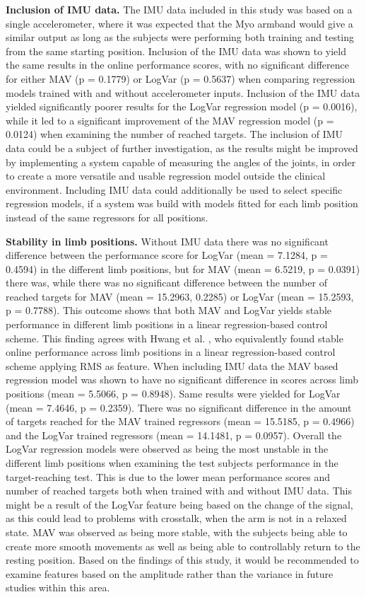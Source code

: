 \begin{multicols}{2}
\textbf{Inclusion of IMU data.} The IMU data included in this study was based on a single accelerometer, where it was expected that the Myo armband would give a similar output as long as the subjects were performing both training and testing from the same starting position. Inclusion of the IMU data was shown to yield the same results in the online performance scores, with no significant difference for either MAV (p = 0.1779) or LogVar (p = 0.5637) when comparing regression models trained with and without accelerometer inputs. Inclusion of the IMU data yielded significantly poorer results for the LogVar regression model (p = 0.0016), while it led to a significant improvement of the MAV regression model (p = 0.0124) when examining the number of reached targets. The inclusion of IMU data could be a subject of further investigation, as the results might be improved by implementing a system capable of measuring the angles of the joints, in order to create a more versatile and usable regression model outside the clinical environment. Including IMU data could additionally be used to select specific regression models, if a system was build with models fitted for each limb position instead of the same regressors for all positions. 

\textbf{Stability in limb positions.} Without IMU data there was no significant difference between the performance score for LogVar (mean = 7.1284, p = 0.4594)  in the different limb positions, but for MAV (mean = 6.5219, p = 0.0391) there was, while there was no significant difference between the number of reached targets for MAV (mean = 15.2963, 0.2285) or LogVar (mean = 15.2593, p = 0.7788). This outcome shows that both MAV and LogVar yields stable performance in different limb positions in a linear regression-based control scheme. This finding agrees with Hwang et al. \cite{Hwang2017}, who equivalently found stable online performance across limb positions in a linear regression-based control scheme applying RMS as feature.
When including IMU data the MAV based regression model was shown to have no significant difference in scores across limb positions (mean = 5.5066, p = 0.8948). Same results were yielded for LogVar (mean = 7.4646, p = 0.2359).  There was no significant difference in the amount of targets reached for the MAV trained regressors (mean = 15.5185, p = 0.4966) and the LogVar trained regressors (mean = 14.1481, p = 0.0957). 
Overall the LogVar regression models were observed as being the most unstable in the different limb positions when examining the test subjects performance in the target-reaching test. This is due to the lower mean performance scores and number of reached targets both when trained with and without IMU data. This might be a result of the LogVar feature being based on the change of the signal, as this could lead to problems with crosstalk, when the arm is not in a relaxed state. MAV was observed as being more stable, with the subjects being able to create more smooth movements as well as being able to controllably return to the resting position. Based on the findings of this study, it would be recommended to examine features based on the amplitude rather than the variance in future studies within this area.


\end{multicols}
